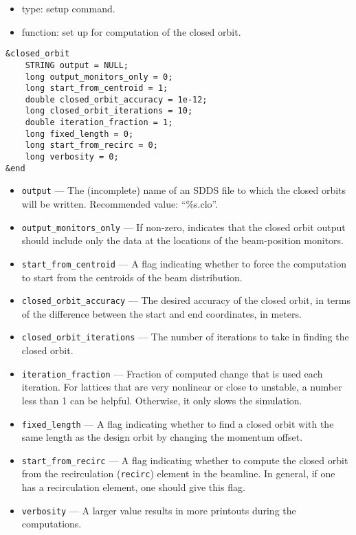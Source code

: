 \documentclass[11pt]{article}
\begin{document}
\begin{itemize}
\item type: setup command.
\item function: set up for computation of the closed orbit.
\end{itemize}

\begin{verbatim}
&closed_orbit
    STRING output = NULL;
    long output_monitors_only = 0;
    long start_from_centroid = 1;
    double closed_orbit_accuracy = 1e-12;
    long closed_orbit_iterations = 10;
    double iteration_fraction = 1;
    long fixed_length = 0;
    long start_from_recirc = 0;
    long verbosity = 0;
&end
\end{verbatim}

\begin{itemize}
\item \verb|output| --- The (incomplete) name of an SDDS file to which
the closed orbits will be written.  Recommended value: ``\%s.clo''.
\item \verb|output_monitors_only| --- If non-zero, indicates that the
closed orbit output should include only the data at the locations of
the beam-position monitors.
\item \verb|start_from_centroid| --- A flag indicating whether to
force the computation to start from the centroids of the beam
distribution.
\item \verb|closed_orbit_accuracy| --- The desired accuracy of the
closed orbit, in terms of the difference between the start and end
coordinates, in meters.
\item \verb|closed_orbit_iterations| --- The number of iterations to
take in finding the closed orbit.
\item \verb|iteration_fraction| --- Fraction of computed change that
is used each iteration.  For lattices that are very nonlinear or close
to unstable, a number less than 1 can be helpful.  Otherwise, it only
slows the simulation.
\item \verb|fixed_length| --- A flag indicating whether to find a
closed orbit with the same length as the design orbit by changing the
momentum offset.
\item \verb|start_from_recirc| --- A flag indicating whether to
compute the closed orbit from the recirculation (\verb|recirc|)
element in the beamline.  In general, if one has a recirculation
element, one should give this flag.
\item \verb|verbosity| --- A larger value results in more printouts
during the computations.
\end{itemize}
\end{document}
